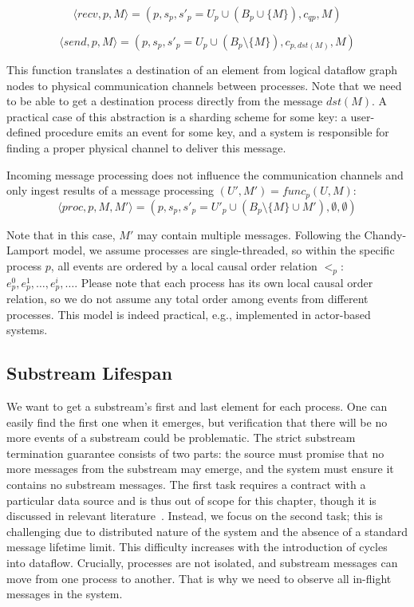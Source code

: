 \begin{equation}
\langle recv, p, M\rangle = (p, s_p, s'_p = U_p \cup \left(B_p \cup \{M\}\right), c_{qp}, M)
\end{equation}

\begin{equation}
\langle send, p, M \rangle = (p, s_p, s'_p = U_p \cup \left(B_p\setminus\{M\}\right), c_{p, dst(M)}, M)
\end{equation}

This function translates a destination of an element from logical dataflow graph nodes to physical communication channels between processes. Note that we need to be able to get a destination process directly from the message $dst(M)$. A practical case of this abstraction is a sharding scheme for some key: a user-defined procedure emits an event for some key, and a system is responsible for finding a proper physical channel to deliver this message.

Incoming message processing does not influence the communication channels and only ingest results of a message processing $(U', M') = func_p(U, M)$:
\begin{equation}
    \langle proc, p, M, M' \rangle = (p, s_p, s'_p = U'_p \cup \left(B_p \setminus \{M\} \cup M' \right) , \emptyset, \emptyset)
\end{equation}

Note that in this case, $M'$ may contain multiple messages. Following the Chandy-Lamport model, we assume processes are single-threaded, so within the specific process $p$, all events are ordered by a local causal order relation $<_p$: $e^{0}_p,e^{1}_p,\ldots,e^{i}_p,\ldots$. Please note that each process has its own local causal order relation, so we do not assume any total order among events from different processes. This model is indeed practical, e.g., implemented in actor-based systems.

\subsection{Substream Lifespan}

We want to get a substream's first and last element for each process. One can easily find the first one when it emerges, but verification that there will be no more events of a substream could be problematic. The strict substream termination guarantee consists of two parts: the source must promise that no more messages from the substream may emerge, and the system must ensure it contains no substream messages. The first task requires a contract with a particular data source and is thus out of scope for this chapter, though it is discussed in relevant literature~\cite{awad2019adaptive}. Instead, we focus on the second task; this is challenging due to distributed nature of the system and the absence of a standard message lifetime limit. This difficulty increases with the introduction of cycles into dataflow. Crucially, processes are not isolated, and substream messages can move from one process to another. That is why we need to observe all in-flight messages in the system.

